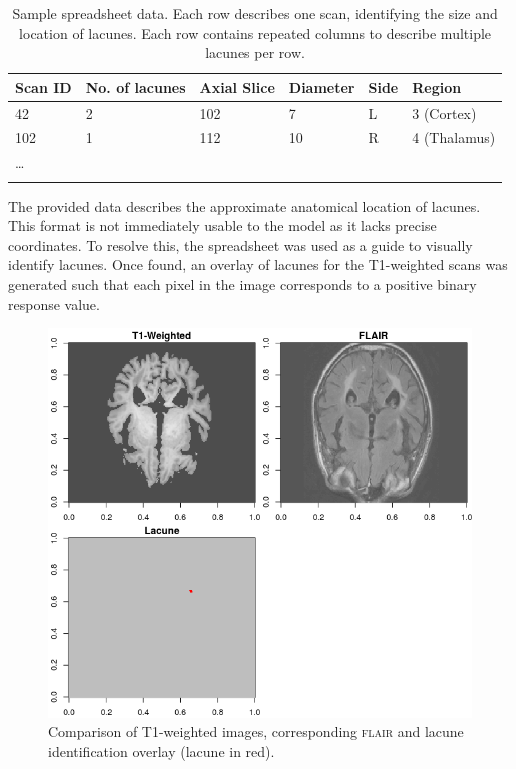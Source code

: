 \begin{table}[ht]
	\centering
	\begin{tabular}{llllll}
	\toprule[1.5pt]
	Scan ID & No. of lacunes & Axial Slice & Diameter & Side & Region\\
	\midrule
	42 & 2 & 102 & 7 & L & 3 (Cortex)\\
	102 & 1 & 112 & 10 & R & 4 (Thalamus)\\
	\ldots\\
	\bottomrule[1.5pt]\\
	\end{tabular}
	\caption{Sample spreadsheet data. Each row describes one scan, identifying the size and location of lacunes. Each row contains repeated columns to describe multiple lacunes per row.}
	\label{data-excel-tab}
\end{table}

The provided data describes the approximate anatomical location of lacunes. This format is not immediately usable to the model as it lacks precise coordinates. To resolve this, the spreadsheet was used as a guide to visually identify lacunes. Once found, an overlay of lacunes for the T1-weighted scans was generated such that each pixel in the image corresponds to a positive binary response value.

\begin{figure}[ht]
\centering
\includegraphics[width=\linewidth]{Images/6_lacune_mask.png}
\caption{Comparison of T1-weighted images, corresponding \textsc{flair} and lacune identification overlay (lacune in red).}
\label{data-t1-flair-lac}
\end{figure}

